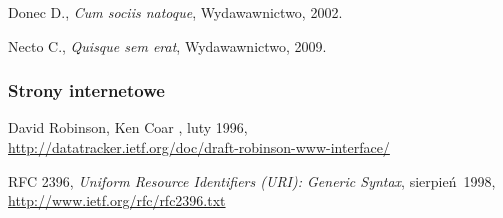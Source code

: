 \cleardoublepage\thispagestyle{plain}
\begin{thebibliography}{99}

  Donec D., {\em Cum sociis natoque}, Wydawawnictwo,  2002.

  Necto C., {\em Quisque sem erat}, Wydawawnictwo,  2009.

  \subsubsection*{Strony internetowe}

  David Robinson, Ken Coar
  ,
  \newblock luty 1996, \\
  \newblock \url{http://datatracker.ietf.org/doc/draft-robinson-www-interface/}

  RFC 2396, 
  {\em Uniform Resource Identifiers (URI): Generic Syntax},
  \newblock sierpień~1998, \\
  \url{http://www.ietf.org/rfc/rfc2396.txt}


\end{thebibliography}
